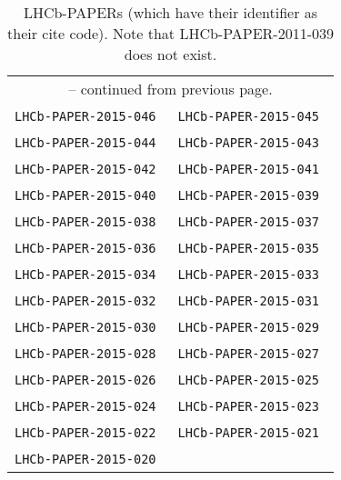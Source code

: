 \begin{center}
\begin{longtable}{ll}
\caption{\small
  LHCb-PAPERs (which have their identifier as their cite code).  
  Note that LHCb-PAPER-2011-039 does not exist.
}
\label{tab:LHCb-PAPERs}
\endfirsthead
\multicolumn{2}{c}{ -- continued from previous page.}
\endhead
\endfoot
\endlastfoot
\hline
\texttt{LHCb-PAPER-2015-047}~\cite{LHCb-PAPER-2015-047} \\
\texttt{LHCb-PAPER-2015-046}~\cite{LHCb-PAPER-2015-046} &
\texttt{LHCb-PAPER-2015-045}~\cite{LHCb-PAPER-2015-045} \\
\texttt{LHCb-PAPER-2015-044}~\cite{LHCb-PAPER-2015-044} &
\texttt{LHCb-PAPER-2015-043}~\cite{LHCb-PAPER-2015-043} \\
\texttt{LHCb-PAPER-2015-042}~\cite{LHCb-PAPER-2015-042} &
\texttt{LHCb-PAPER-2015-041}~\cite{LHCb-PAPER-2015-041} \\
\texttt{LHCb-PAPER-2015-040}~\cite{LHCb-PAPER-2015-040} &
\texttt{LHCb-PAPER-2015-039}~\cite{LHCb-PAPER-2015-039} \\
\texttt{LHCb-PAPER-2015-038}~\cite{LHCb-PAPER-2015-038} &
\texttt{LHCb-PAPER-2015-037}~\cite{LHCb-PAPER-2015-037} \\
\texttt{LHCb-PAPER-2015-036}~\cite{LHCb-PAPER-2015-036} &
\texttt{LHCb-PAPER-2015-035}~\cite{LHCb-PAPER-2015-035} \\
\texttt{LHCb-PAPER-2015-034}~\cite{LHCb-PAPER-2015-034} &
\texttt{LHCb-PAPER-2015-033}~\cite{LHCb-PAPER-2015-033} \\
\texttt{LHCb-PAPER-2015-032}~\cite{LHCb-PAPER-2015-032} &
\texttt{LHCb-PAPER-2015-031}~\cite{LHCb-PAPER-2015-031} \\
\texttt{LHCb-PAPER-2015-030}~\cite{LHCb-PAPER-2015-030} &
\texttt{LHCb-PAPER-2015-029}~\cite{LHCb-PAPER-2015-029} \\
\texttt{LHCb-PAPER-2015-028}~\cite{LHCb-PAPER-2015-028} &
\texttt{LHCb-PAPER-2015-027}~\cite{LHCb-PAPER-2015-027} \\
\texttt{LHCb-PAPER-2015-026}~\cite{LHCb-PAPER-2015-026} &
\texttt{LHCb-PAPER-2015-025}~\cite{LHCb-PAPER-2015-025} \\
\texttt{LHCb-PAPER-2015-024}~\cite{LHCb-PAPER-2015-024} &
\texttt{LHCb-PAPER-2015-023}~\cite{LHCb-PAPER-2015-023} \\
\texttt{LHCb-PAPER-2015-022}~\cite{LHCb-PAPER-2015-022} &
\texttt{LHCb-PAPER-2015-021}~\cite{LHCb-PAPER-2015-021} \\
\texttt{LHCb-PAPER-2015-020}~\cite{LHCb-PAPER-2015-020} &

\end{longtable}
\end{center}
